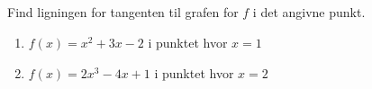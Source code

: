 \documentclass[10pt,a4paper,table]{article}
\begin{document}
\subsection{}
Find ligningen for tangenten til grafen for $f$ i det angivne punkt.
\begin{enumerate}[label=\arabic*)]
  \item $f(x)=x^2+3x-2$ i punktet hvor $x=1$
  \item $f(x)=2x^3-4x+1$ i punktet hvor $x=2$
\end{enumerate}
\end{document}
